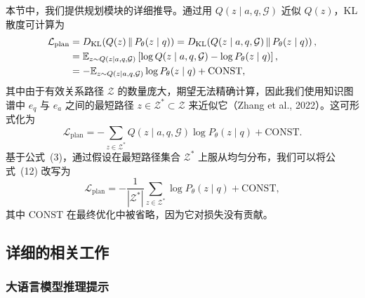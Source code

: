 \documentclass[11pt,UTF8,fontset=fandol]{ctexart}
\begin{document}
本节中，我们提供规划模块的详细推导。通过用 $Q(z \mid a, q, \mathcal{G})$ 近似 $Q(z)$，KL 散度可计算为
\begin{align}
\mathcal{L}_{\text{plan}} &= D_{\mathrm{KL}}\!\left( Q(z) \,\|\, P_\theta(z \mid q) \right) = D_{\mathrm{KL}}\!\left( Q(z \mid a, q, \mathcal{G}) \,\|\, P_\theta(z \mid q) \right), \notag \\
&= \mathbb{E}_{z \sim Q(z \mid a, q, \mathcal{G})} \left[ \log Q(z \mid a, q, \mathcal{G}) - \log P_\theta(z \mid q) \right], \\
&= -\mathbb{E}_{z \sim Q(z \mid a, q, \mathcal{G})} \log P_\theta(z \mid q) + \mathrm{CONST}, \notag
\end{align}
其中由于有效关系路径 $\mathcal{Z}$ 的数量庞大，期望无法精确计算，因此我们使用知识图谱中 $e_q$ 与 $e_a$ 之间的最短路径 $z \in \mathcal{Z}^* \subset \mathcal{Z}$ 来近似它（Zhang et al., 2022）。这可形式化为
\begin{equation}
\mathcal{L}_{\text{plan}} = -\sum_{z \in \mathcal{Z}^*} Q(z \mid a, q, \mathcal{G}) \log P_\theta(z \mid q) + \mathrm{CONST}.
\end{equation}
基于公式~(3)，通过假设在最短路径集合 $\mathcal{Z}^*$ 上服从均匀分布，我们可以将公式~(12) 改写为
\begin{equation}
\mathcal{L}_{\text{plan}} = -\frac{1}{|\mathcal{Z}^*|} \sum_{z \in \mathcal{Z}^*} \log P_\theta(z \mid q) + \mathrm{CONST},
\end{equation}
其中 $\mathrm{CONST}$ 在最终优化中被省略，因为它对损失没有贡献。

\subsection{详细的相关工作}

\subsubsection{大语言模型推理提示}
\end{document}
